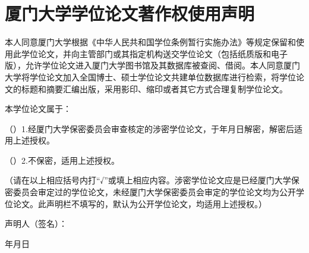 \ExplSyntaxOn
\chapter*{厦门大学学位论文著作权使用声明}
本人同意厦门大学根据《中华人民共和国学位条例暂行实施办法》等规定保留和使用此学位论文，并向主管部门或其指定机构送交学位论文（包括纸质版和电子版），允许学位论文进入厦门大学图书馆及其数据库被查阅、借阅。本人同意厦门大学将学位论文加入全国博士、硕士学位论文共建单位数据库进行检索，将学位论文的标题和摘要汇编出版，采用影印、缩印或者其它方式合理复制学位论文。\par

本学位论文属于：\par

（\qquad ）1.经厦门大学保密委员会审查核定的涉密学位论文，于\qquad 年\qquad 月\qquad 日解密，解密后适用上述授权。\par

（\qquad ）2.不保密，适用上述授权。\par

（请在以上相应括号内打“√”或填上相应内容。涉密学位论文应是已经厦门大学保密委员会审定过的学位论文，未经厦门大学保密委员会审定的学位论文均为公开学位论文。此声明栏不填写的，默认为公开学位论文，均适用上述授权。）\par

\vspace{12ex}
{
    \raggedleft
    声明人（签名）：\phantom{六个字的空白}\par
    年\qquad 月\qquad 日\phantom{这七个字的空白}\par
}

\ExplSyntaxOff